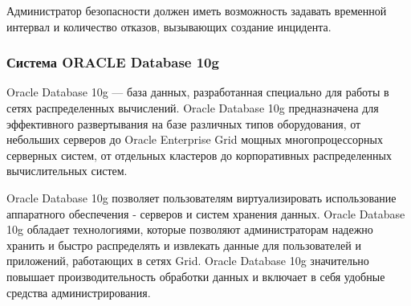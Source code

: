 Администратор безопасности должен иметь возможность задавать временной интервал и количество отказов, вызывающих создание инцидента.

\subsubsection{Система ORACLE Database 10g}
Oracle Database 10g --- база данных, разработанная специально для работы в сетях распределенных вычислений. Oracle Database 10g предназначена для эффективного развертывания на базе различных типов оборудования, от небольших серверов до Oracle Enterprise Grid мощных многопроцессорных серверных систем, от отдельных кластеров до корпоративных распределенных вычислительных систем.

Oracle Database 10g позволяет пользователям виртуализировать использование аппаратного обеспечения - серверов и систем хранения данных. Oracle Database 10g обладает технологиями, которые позволяют администраторам надежно хранить и быстро распределять и извлекать данные для пользователей и приложений, работающих в сетях Grid. Oracle Database 10g значительно повышает производительность обработки данных и включает в себя удобные средства администрирования.


